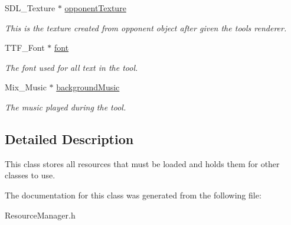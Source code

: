 \begin{DoxyCompactItemize}
\mbox{\label{class_resource_manager_a5ee71938e58631c074a87ec316273cdb}} 
S\+D\+L\+\_\+\+Texture $\ast$ \mbox{\hyperlink{class_resource_manager_a5ee71938e58631c074a87ec316273cdb}{opponent\+Texture}}
\begin{DoxyCompactList}\small\item\em This is the texture created from opponent object after given the tool\textquotesingle{}s renderer. \end{DoxyCompactList}\item 
\mbox{\label{class_resource_manager_a178a34ee6625bc871e701ff1df56d3ac}} 
T\+T\+F\+\_\+\+Font $\ast$ \mbox{\hyperlink{class_resource_manager_a178a34ee6625bc871e701ff1df56d3ac}{font}}
\begin{DoxyCompactList}\small\item\em The font used for all text in the tool. \end{DoxyCompactList}\item 
\mbox{\label{class_resource_manager_a0ff25c7a84100edb4f62a24cd0226149}} 
Mix\+\_\+\+Music $\ast$ \mbox{\hyperlink{class_resource_manager_a0ff25c7a84100edb4f62a24cd0226149}{background\+Music}}
\begin{DoxyCompactList}\small\item\em The music played during the tool. \end{DoxyCompactList}\end{DoxyCompactItemize}


\subsection{Detailed Description}
This class stores all resources that must be loaded and holds them for other classes to use. 

The documentation for this class was generated from the following file\+:\begin{DoxyCompactItemize}
\item 
Resource\+Manager.\+h\end{DoxyCompactItemize}
